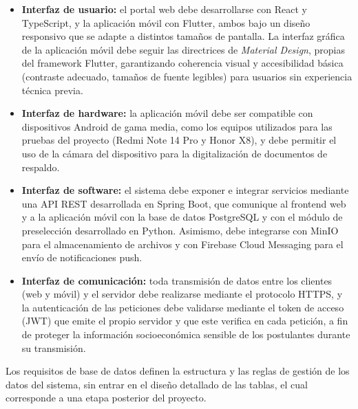 \begin{itemize}
    \item \textbf{Interfaz de usuario:} el portal web debe desarrollarse con React y TypeScript, y la aplicación móvil con Flutter, ambos bajo un diseño responsivo que se adapte a distintos tamaños de pantalla. La interfaz gráfica de la aplicación móvil debe seguir las directrices de \textit{Material Design}, propias del framework Flutter, garantizando coherencia visual y accesibilidad básica (contraste adecuado, tamaños de fuente legibles) para usuarios sin experiencia técnica previa.
    \item \textbf{Interfaz de hardware:} la aplicación móvil debe ser compatible con dispositivos Android de gama media, como los equipos utilizados para las pruebas del proyecto (Redmi Note 14 Pro y Honor X8), y debe permitir el uso de la cámara del dispositivo para la digitalización de documentos de respaldo.
    \item \textbf{Interfaz de software:} el sistema debe exponer e integrar servicios mediante una API REST desarrollada en Spring Boot, que comunique al frontend web y a la aplicación móvil con la base de datos PostgreSQL y con el módulo de preselección desarrollado en Python. Asimismo, debe integrarse con MinIO para el almacenamiento de archivos y con Firebase Cloud Messaging para el envío de notificaciones push.
    \item \textbf{Interfaz de comunicación:} toda transmisión de datos entre los clientes (web y móvil) y el servidor debe realizarse mediante el protocolo HTTPS, y la autenticación de las peticiones debe validarse mediante el token de acceso (JWT) que emite el propio servidor y que este verifica en cada petición, a fin de proteger la información socioeconómica sensible de los postulantes durante su transmisión.
\end{itemize}

\label{sec:ieee_requisitos_bd}

Los requisitos de base de datos definen la estructura y las reglas de gestión de los datos del sistema, sin entrar en el diseño detallado de las tablas, el cual corresponde a una etapa posterior del proyecto.

